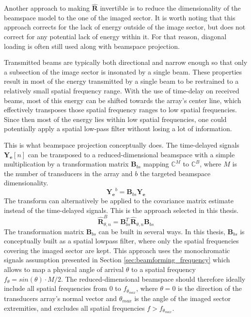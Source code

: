 Another approach to making $\boldsymbol{\hat{R}}$ invertible is to reduce the dimensionality of the beamspace model to the one of the imaged sector.
It is worth noting that this approach corrects for the lack of energy outside of the image sector, but does not correct for any potential lack of energy within it. For that reason, diagonal loading is often still used along with beamspace projection.

Transmitted beams are typically both directional and narrow enough so that only a subsection of the image sector is insonated by a single beam. These properties result in most of the energy transmitted by a single beam to be restrained to a relatively small spatial frequency range. With the use of time-delay on received beams, most of this energy can be shifted towards the array's center line, which effectively transposes those spatial frequency ranges to low spatial frequencies. Since then most of the energy lies within low spatial frequencies, one could potentially apply a spatial low-pass filter without losing a lot of information.

This is what beamspace projection conceptually does. The time-delayed signals $\boldsymbol{Y_e}[n]$ can be transposed to a reduced-dimensional beamspace with a simple multiplication by a transformation matrix $\boldsymbol{B}_{bs}$ mapping $\mathbb{C}^M$ to $\mathbb{C}^B$, where $M$ is the number of transducers in the array and $b$ the targeted beamspace dimensionality.
\begin{equation}
    \boldsymbol{Y_e}^b =  \boldsymbol{B}_{bs} \boldsymbol{Y_e}
\end{equation}
\noindent
The transform can alternatively be applied to the covariance matrix estimate instead of the time-delayed signals. This is the approach selected in this thesis.
\begin{equation}
    \boldsymbol{\hat{R}}_{\theta,n}^B =  \boldsymbol{B}_{bs}^T \boldsymbol{\hat{R}}_{\theta,n} \boldsymbol{B}_{bs}
\end{equation}
\noindent
The transformation matrix $\boldsymbol{B}_{bs}$ can be built in several ways. In this thesis, $\boldsymbol{B}_{bs}$ is conceptually built as a spatial lowpass filter, where only the spatial frequencies covering the imaged sector are kept. This approach uses the monochromatic signals assumption presented in Section \ref{sec:beamforming_frequency} which allows to map a physical angle of arrival $\theta$ to a spatial frequency $f_\theta = sin(\theta) \cdot M / 2$. The reduced-dimensional beamspace should therefore ideally include all spatial frequencies from $0$ to $f_{\theta_{max}}$, where $\theta = 0$ is the direction of the transducers array's normal vector and $\theta_{max}$ is the angle of the imaged sector extremities, and excludes all spatial frequencies $f > f_{\theta_{max}}$.

